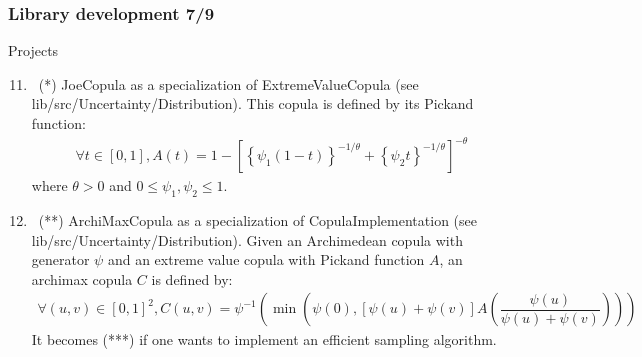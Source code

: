 \documentclass[8pt]{beamer}
\begin{document}
\begin{frame}
  \frametitle{Library development 7/9}
  \begin{block}{Projects}
    \begin{enumerate}
      \setcounter{enumi}{10}
    \item~(*) \alert{\ttfamily JoeCopula} as a specialization of {\ttfamily ExtremeValueCopula} (see {\ttfamily lib/src/Uncertainty/Distribution}). This copula is defined by its Pickand function:
      \begin{align}
        \forall t\in[0,1], A(t)=1-\left[\left\{\psi_1(1-t)\right\}^{-1/\theta}+\left\{\psi_2t\right\}^{-1/\theta}\right]^{-\theta}
      \end{align}
      where $\theta>0$ and $0\leq\psi_1,\psi_2\leq 1$.
    \item~(**) \alert{\ttfamily ArchiMaxCopula} as a specialization of {\ttfamily CopulaImplementation} (see {\ttfamily lib/src/Uncertainty/Distribution}). Given an Archimedean copula with generator $\psi$ and an extreme value copula with Pickand function $A$, an archimax copula $C$ is defined by:
      \begin{align}
        \forall (u,v)\in[0,1]^2, C(u,v)=\psi^{-1}\left(\min\left(\psi(0), [\psi(u)+\psi(v)]A\left(\dfrac{\psi(u)}{\psi(u)+\psi(v)}\right)\right)\right)
      \end{align}
      It becomes (***) if one wants to implement an efficient sampling algorithm.
    \end{enumerate}
  \end{block}
\end{frame}
\end{document}
